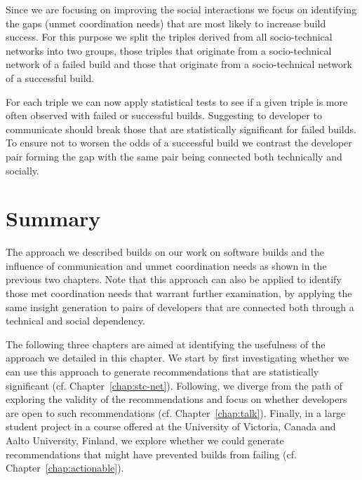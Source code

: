 Since we are focusing on improving the social interactions we focus on identifying the gaps (unmet coordination needs) that are most likely to increase build success.
For this purpose we split the triples derived from all socio-technical networks into two groups, those triples that originate from a socio-technical network of a failed build and those that originate from a socio-technical network of a successful build.

For each triple we can now apply statistical tests to see if a given triple is more often observed with failed or successful builds.
Suggesting to developer to communicate should break those that are statistically significant for failed builds.
To ensure not to worsen the odds of a successful build we contrast the developer pair forming the gap with the same pair being connected both technically and socially.

\section{Summary}
The approach we described builds on our work on software builds and the influence of communication and unmet coordination needs as shown in the previous two chapters.
Note that this approach can also be applied to identify those met coordination needs that warrant further examination, by applying the same insight generation to pairs of developers that are connected both through a technical and social dependency.

The following three chapters are aimed at identifying the usefulness of the approach we detailed in this chapter.
We start by first investigating whether we can use this approach to generate recommendations that are statistically significant (cf. Chapter~\ref{chap:stc-net}).
Following, we diverge from the path of exploring the validity of the recommendations and focus on whether developers are open to such recommendations (cf. Chapter~\ref{chap:talk}).
Finally, in a large student project in a course offered at the University of Victoria, Canada and Aalto University, Finland, we explore whether we could generate recommendations that might have prevented builds from failing (cf. Chapter~\ref{chap:actionable}).